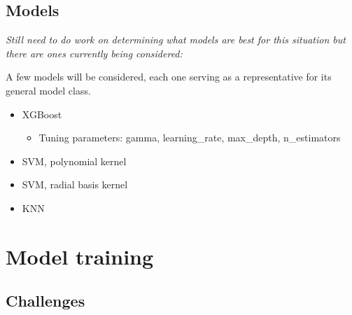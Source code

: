 \documentclass[11pt]{article}
\theoremstyle{definition}
\begin{document}
\subsection{Models}

\textit{Still need to do work on determining what models are best for this situation but there are ones currently being considered:}

A few models will be considered, each one serving as a representative for its general model class.

\begin{itemize}
    \item XGBoost
    \begin{itemize}
        \item Tuning parameters: gamma, learning\_rate, max\_depth, n\_estimators
    \end{itemize}
    \item SVM, polynomial kernel
    \item SVM, radial basis kernel
    \item KNN
\end{itemize}




\newpage

\section{Model training}

\subsection{Challenges}
\end{document}
